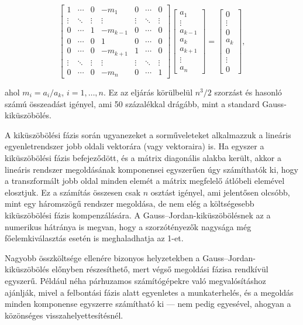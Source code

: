 \documentclass[
  magyar,
  11pt]{article}
\begin{document}
\[\begin{bmatrix} 1 & \cdots & 0 & -m_1 & 0 & \cdots & 0 \\ \vdots & \ddots & \vdots & \vdots & \vdots & \ddots & \vdots \\ 0 & \cdots & 1 & -m_{k-1} & 0 & \cdots & 0 \\ 0 & \cdots & 0 & 1 & 0 & \cdots & 0 \\ 0 & \cdots & 0 & -m_{k+1} & 1 & \cdots & 0 \\ \vdots & \ddots & \vdots & \vdots & \vdots & \ddots & \vdots \\ 0 & \cdots & 0 & -m_n & 0 & \cdots & 1 \end{bmatrix} \begin{bmatrix} a_1 \\ \vdots \\ a_{k-1} \\ a_k \\ a_{k+1} \\ \vdots \\ a_n \end{bmatrix} = \begin{bmatrix} 0 \\ \vdots \\ 0 \\ a_k \\ 0 \\ \vdots \\ 0 \end{bmatrix},\]

ahol \(m_i = a_i/a_k\), \(i = 1, \dots, n\). Ez az eljárás körülbelül
\(n^3/2\) szorzást és hasonló számú összeadást igényel, ami 50
százalékkal drágább, mint a standard Gauss-kiküszöbölés.

A kiküszöbölési fázis során ugyanezeket a sorműveleteket alkalmazzuk a
lineáris egyenletrendszer jobb oldali vektorára (vagy vektoraira) is. Ha
egyszer a kiküszöbölési fázis befejeződött, és a mátrix diagonális
alakba került, akkor a lineáris rendszer megoldásának komponensei
egyszerűen úgy számíthatók ki, hogy a transzformált jobb oldal minden
elemét a mátrix megfelelő átlóbeli elemével elosztjuk. Ez a számítás
összesen csak \(n\) osztást igényel, ami jelentősen olcsóbb, mint egy
háromszögű rendszer megoldása, de nem elég a költségesebb kiküszöbölési
fázis kompenzálására. A Gauss--Jordan-kiküszöbölésnek az a numerikus
hátránya is megvan, hogy a szorzótényezők nagysága még főelemkiválasztás
esetén is meghaladhatja az 1-et.

Nagyobb összköltsége ellenére bizonyos helyzetekben a
Gauss--Jordan-kiküszöbölés előnyben részesíthető, mert végső megoldási
fázisa rendkívül egyszerű. Például néha párhuzamos számítógépekre való
megvalósításhoz ajánlják, mivel a felbontási fázis alatt egyenletes a
munkaterhelés, és a megoldás minden komponense egyszerre számítható ki
--- nem pedig egyesével, ahogyan a közönséges visszahelyettesítésnél.
\end{document}
